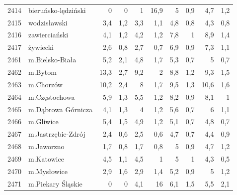 \begin{center}
\begin{longtable}{lp{3cm}rrrrrrrr}
2414 & bieruńsko-lędziński     & 0       & 0           & 1        & 16,9         & 5        & 0,9          & 4,7      & 1,2          \\
2415 & wodzisławski            & 3,4     & 1,2         & 3,3      & 1,1          & 4,8      & 0,8          & 4,3      & 0,8          \\
2416 & zawierciański           & 4,1     & 1,2         & 4,2      & 1,2          & 7,8      & 1            & 8,9      & 1,4          \\
2417 & żywiecki                & 2,6     & 0,8         & 2,7      & 0,7          & 6,9      & 0,9          & 7,3      & 1,1          \\
2461 & m.Bielsko-Biała         & 5,2     & 2,1         & 4,8      & 1,7          & 5,3      & 0,7          & 5        & 0,7          \\
2462 & m.Bytom                 & 13,3    & 2,7         & 9,2      & 2            & 8,8      & 1,2          & 9,3      & 1,5          \\
2463 & m.Chorzów               & 10,2    & 2,4         & 8        & 1,7          & 9,5      & 1,3          & 10,6     & 1,6          \\
2464 & m.Częstochowa           & 5,9     & 1,3         & 5,5      & 1,2          & 8,2      & 0,9          & 8,1      & 1            \\
2465 & m.Dąbrowa Górnicza      & 4,1     & 1,3         & 4        & 1,2          & 5,6      & 0,7          & 6        & 1,1          \\
2466 & m.Gliwice               & 5,4     & 1,5         & 4,9      & 1,2          & 5,1      & 0,7          & 4,8      & 0,7          \\
2467 & m.Jastrzębie-Zdrój      & 2,4     & 0,6         & 2,5      & 0,6          & 4,7      & 0,7          & 4,4      & 0,9          \\
2468 & m.Jaworzno              & 1,7     & 0,8         & 1,7      & 0,8          & 5        & 0,9          & 4,7      & 1,2          \\
2469 & m.Katowice              & 4,5     & 1,1         & 4,5      & 1            & 5        & 1            & 4,3      & 0,5          \\
2470 & m.Mysłowice             & 2,9     & 1,6         & 2,9      & 1,4          & 5,2      & 0,9          & 5        & 1,2          \\
2471 & m.Piekary Śląskie       & 0       & 0           & 4,1      & 16           & 6,1      & 1,5          & 5,5      & 2,1          \\

\end{longtable}
\end{center}
